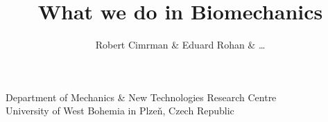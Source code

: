 \title{What we do in Biomechanics}

\author{Robert Cimrman \& Eduard Rohan \& \dots}

\institute%
{
  Department of Mechanics \& New Technologies Research Centre \\
  University of West Bohemia in Plze\v{n}, Czech Republic
}

%
%
